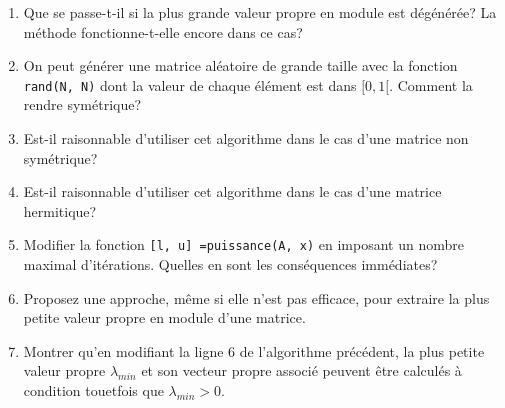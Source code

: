 \documentclass[a4paper, 12pt]{article}
\begin{document}
\begin{enumerate}
\item Que se passe-t-il si la plus grande valeur propre en module est dégénérée? 
La méthode fonctionne-t-elle encore dans ce cas?

\item On peut générer une matrice aléatoire de grande taille avec la fonction {\tt rand(N, N)}
dont la valeur de chaque élément est dans $[0, 1[$. Comment la rendre symétrique?

\item Est-il raisonnable d'utiliser cet algorithme dans le cas d'une matrice non symétrique?

\item Est-il raisonnable d'utiliser cet algorithme dans le cas d'une matrice hermitique?

\item Modifier la fonction  {\tt [l, u] =puissance(A, x)} en imposant
un nombre maximal d'itérations.  Quelles en sont les conséquences immédiates?

\item Proposez une approche, même si elle n'est pas efficace, pour extraire la plus petite valeur propre en module d'une matrice.

\item Montrer qu'en modifiant la ligne 6 de l'algorithme précédent, la plus petite valeur propre $\lambda_{min}$
et son vecteur propre associé peuvent être calculés à condition touetfois que $\lambda_{min}>0$.

\end{enumerate} 
\end{document}
